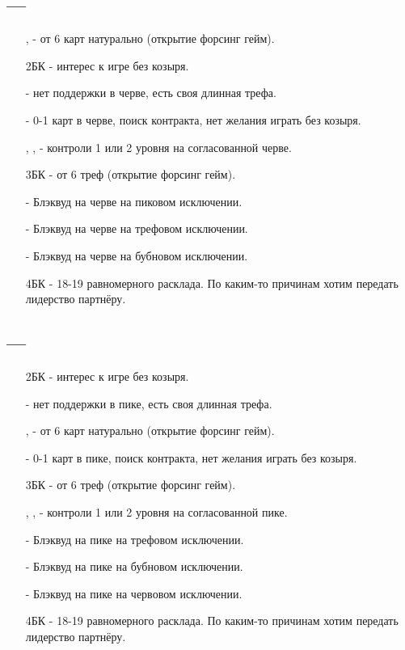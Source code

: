 \documentclass{article}
\begin{document}
\subsection{ --- }
\begin{enumerate}
    \item[\sp{2}, \di{3}] - от 6 карт натурально (открытие форсинг гейм).
    \item[2БК] - интерес к игре без козыря.
    \item[\cl{3}] - нет поддержки в черве, есть своя длинная трефа.
    \item[\he{3}] - 0-1 карт в черве, поиск контракта, нет желания играть без козыря.
    \item[\sp{3}, \cl{4}, \di{4}] - контроли 1 или 2 уровня на согласованной черве.
    \item[3БК] - от 6 треф (открытие форсинг гейм).
    \item[\he{4}] - Блэквуд на черве на пиковом исключении.
    \item[\sp{4}] - Блэквуд на черве на трефовом исключении.
    \item[\cl{5}] - Блэквуд на черве на бубновом исключении.
    \item[4БК] - 18-19 равномерного расклада. По каким-то причинам хотим передать лидерство партнёру.
\end{enumerate}
\subsection{ --- }
\begin{enumerate}
    \item[2БК] - интерес к игре без козыря.
    \item[\cl{3}] - нет поддержки в пике, есть своя длинная трефа.
    \item[\di{3}, \he{3}] - от 6 карт натурально (открытие форсинг гейм).
    \item[\sp{3}] - 0-1 карт в пике, поиск контракта, нет желания играть без козыря.
    \item[3БК] - от 6 треф (открытие форсинг гейм).
    \item[\cl{4}, \di{4}, \he{4}] - контроли 1 или 2 уровня на согласованной пике.
    \item[\sp{4}] - Блэквуд на пике на трефовом исключении.
    \item[\cl{5}] - Блэквуд на пике на бубновом исключении.
    \item[\di{5}] - Блэквуд на пике на червовом исключении.
    \item[4БК] - 18-19 равномерного расклада. По каким-то причинам хотим передать лидерство партнёру.
\end{enumerate}
\end{document}
